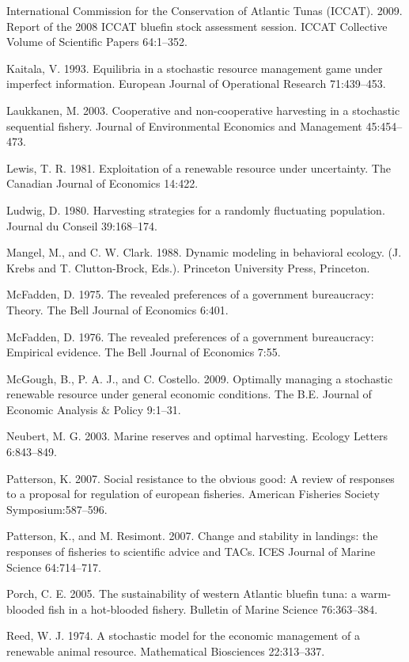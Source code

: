 \documentclass[review,12pt,author-year,titlepage]{components/elsarticle} %
\begin{document}
\begin{flushleft}
International Commission for the Conservation of Atlantic Tunas (ICCAT).
2009. Report of the 2008 ICCAT bluefin stock assessment session. ICCAT
Collective Volume of Scientific Papers 64:1--352.

Kaitala, V. 1993. Equilibria in a stochastic resource management game
under imperfect information. European Journal of Operational Research
71:439--453.

Laukkanen, M. 2003. Cooperative and non-cooperative harvesting in a
stochastic sequential fishery. Journal of Environmental Economics and
Management 45:454--473.

Lewis, T. R. 1981. Exploitation of a renewable resource under
uncertainty. The Canadian Journal of Economics 14:422.

Ludwig, D. 1980. Harvesting strategies for a randomly fluctuating
population. Journal du Conseil 39:168--174.

Mangel, M., and C. W. Clark. 1988. Dynamic modeling in behavioral
ecology. (J. Krebs and T. Clutton-Brock, Eds.). Princeton University
Press, Princeton.

McFadden, D. 1975. The revealed preferences of a government bureaucracy:
Theory. The Bell Journal of Economics 6:401.

McFadden, D. 1976. The revealed preferences of a government bureaucracy:
Empirical evidence. The Bell Journal of Economics 7:55.

McGough, B., P. A. J., and C. Costello. 2009. Optimally managing a
stochastic renewable resource under general economic conditions. The
B.E. Journal of Economic Analysis \& Policy 9:1--31.

Neubert, M. G. 2003. Marine reserves and optimal harvesting. Ecology
Letters 6:843--849.

Patterson, K. 2007. Social resistance to the obvious good: A review of
responses to a proposal for regulation of european fisheries. American
Fisheries Society Symposium:587--596.

Patterson, K., and M. Resimont. 2007. Change and stability in landings:
the responses of fisheries to scientific advice and TACs. ICES Journal
of Marine Science 64:714--717.

Porch, C. E. 2005. The sustainability of western Atlantic bluefin tuna:
a warm-blooded fish in a hot-blooded fishery. Bulletin of Marine Science
76:363--384.

Reed, W. J. 1974. A stochastic model for the economic management of a
renewable animal resource. Mathematical Biosciences 22:313--337.


\end{flushleft}
\end{document}
